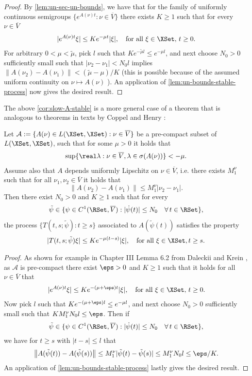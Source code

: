 \documentclass[a4paper]{siamart190516}
\begin{document}
\begin{proof}
By \cref{lem:un-sec-un-bounds}, we have that for the family of uniformly continuous semigroups $\{ e^{A(\nu)t} : \nu \in \overline{V} \}$ there exists $K \geq 1$ such that for every $\nu \in \overline{V}$
 \[
 | e^{A(\nu)t} \xi | \leq K e^{-\mu t} |\xi|, \quad \text{for all } \xi \in \XSet,  \, t \geq 0.
 \]
 For arbitrary $0 < \mu < \tilde{\mu}$, pick $l$ such that $Ke^{-\tilde{\mu} l} \leq e^{-\mu l}$, and next choose $ N_0 > 0$ sufficiently small such that
 $|\nu_2 - \nu_1| < N_0 l$ implies $\| A(\nu_2) - A(\nu_1) \| < (\tilde{\mu}-\mu) / K$ (this is possible because of the assumed uniform continuity on
 $\nu \mapsto A(\nu)$ ).
An application of \cref{lem:un-bounds-stable-process} now gives the desired result.
\end{proof} 
The above \cref{cor:slow-A-stable} is a more general case of a theorem that is analogous to theorems in texts by Coppel \cite{Co78} and Henry \cite{He81}:

\begin{corollary}\label{cor:slow-A-Henry}
Let $\mathcal{A} := \{ A(\nu) \in L(\XSet,\XSet): \nu \in \overline{V}\}$ be a pre-compact subset of $L(\XSet,\XSet)$, such that for some $\mu > 0$ it holds that
\[
\sup \{ \real \lambda: \nu \in \overline{V}, \lambda \in \sigma(A(\nu)) \} < -\mu.
\]
Assume also that $A$ depends uniformly Lipschitz on $\nu \in \overline{V}$, i.e. there exists $M_1^{\nu}$ such that for all $\nu_1, \nu_2 \in \overline{V}$ it holds that
\[
\| A(\nu_2) - A(\nu_1) \| \leq M_1^{\nu} |\nu_2 - \nu_1|.
\]
Then there exist $N_0 > 0$ and $K \geq 1$ such that for every
\[
\tilde{\psi} \in \{\psi \in C^1(\RSet,\overline{V}): | \dot{\psi}(t) | \leq N_0 \quad \forall \, t \in \RSet \},
\]
the process $\{ T(t,s ; \tilde{\psi}): t \geq s \}$ associated to $A(\tilde{\psi}(t))$ satisfies the property
 \[
 | T(t,s ; \tilde{\psi}) \xi | \leq K e^{-\mu (t-s) } |\xi|, \quad \text{for all } \xi \in \XSet, t \geq s.
 \]
\end{corollary}

\begin{proof}
As shown for example in Chapter III Lemma 6.2 from Daleckii and Krein \cite{DaKr74}, as $\mathcal{A}$ is pre-compact there exist $\eps>0$ and $K \geq 1$ such that it holds for all $\nu \in \overline{V}$ that
\[
 | e^{A(\nu)t} \xi | \leq K e^{-(\mu+\eps) t} |\xi|, \quad \text{for all } \xi \in \XSet,  \, t \geq 0.
\]
Now pick $l$ such that $Ke^{-(\mu+\eps) l} \leq e^{-\mu l}$, and next choose $N_0 > 0$ sufficiently small such that $K M_1^{\nu} N_0 l  \leq \eps$. Then if
\[
\tilde{\psi} \in \{\psi \in C^1(\RSet,\overline{V}): | \dot{\psi}(t) | \leq N_0 \quad \forall \, t \in \RSet \},
\] 
we have for $t \geq s$ with $|t-s| \leq l$ that
 \begin{align*}
\left\| A(\tilde{\psi}(t)) - A(\tilde{\psi}(s)) \right\| \leq   M_1^{\nu} |\tilde{\psi}(t) - \tilde{\psi}(s)| \leq M_1^{\nu} N_0 l \leq \eps / K.
\end{align*}
An application of \cref{lem:un-bounds-stable-process} lastly gives the desired result.
\end{proof}
\end{document}
